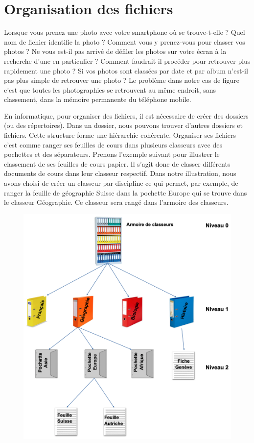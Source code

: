 \documentclass[11pt, a4paper]{book}
\begin{document}
\section{Organisation des fichiers}

Lorsque vous prenez une photo avec votre smartphone où se trouve-t-elle ? Quel nom de fichier identifie la photo ? Comment vous y prenez-vous pour classer vos photos ? Ne vous est-il pas arrivé de défiler les photos sur votre écran à la recherche d’une en particulier ? Comment faudrait-il procéder pour retrouver plus rapidement une photo ? Si vos photos sont classées par date et par album n’est-il pas plus simple de retrouver une photo ? Le problème dans notre cas de figure c'est que toutes les photographies se retrouvent au même endroit, sans classement, dans la mémoire permanente du téléphone mobile.

En informatique, pour organiser des fichiers, il est nécessaire de créer des dossiers (ou des répertoires). Dans un dossier, nous pouvons trouver d’autres dossiers et fichiers. Cette structure forme une hiérarchie cohérente. Organiser ses fichiers c’est comme ranger ses feuilles de cours dans plusieurs classeurs avec des pochettes et des séparateurs. Prenons l’exemple suivant pour illustrer le classement de ses feuilles de cours papier. Il s’agit donc de classer différents documents de cours dans leur classeur respectif. Dans notre illustration, nous avons choisi de créer un classeur par discipline ce qui permet, par exemple, de ranger la feuille de géographie Suisse dans la pochette Europe qui se trouve dans le classeur Géographie. Ce classeur sera rangé dans l’armoire des classeurs.

\begin{figure}[h!]
\centering
\includegraphics[width=12cm]{images/organisationfichiers}
\end{figure}
\end{document}

